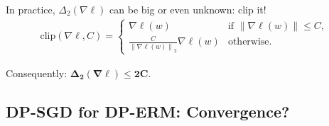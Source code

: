 \documentclass{beamer}
\newcommand{\norm}[1]{\left \lVert #1 \right \rVert}
\begin{document}
\begin{frame}
  In practice, $\Delta_2(\nabla\ell)$ can be \alert{big} or even \alert{unknown}: clip it!
  \vspace{1em}
  \begin{align*}
    \text{clip}(\nabla \ell, C) =
    \begin{cases}
      \nabla\ell(w) & \text{if }\norm{\nabla\ell(w)} \le C, \\
      \frac{C}{\norm{\nabla\ell(w)}_2} \nabla\ell(w) & \text{otherwise}.
    \end{cases}
  \end{align*}

  \vspace{1em}

  Consequently: \alert{$\mathbf{\Delta_2(\nabla\ell) \le 2C}$}.

  \vspace{2em}
\end{frame}






\subsection{DP-SGD for DP-ERM: Convergence?}
\end{document}
